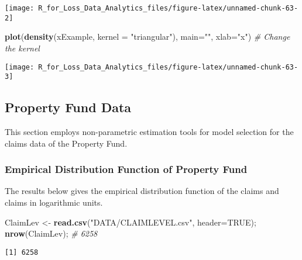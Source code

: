 \documentclass[]{book}
\newenvironment{Shaded}{\begin{snugshade}}{\end{snugshade}}
\newcommand{\KeywordTok}[1]{\textcolor[rgb]{0.13,0.29,0.53}{\textbf{#1}}}
\newcommand{\DataTypeTok}[1]{\textcolor[rgb]{0.13,0.29,0.53}{#1}}
\newcommand{\StringTok}[1]{\textcolor[rgb]{0.31,0.60,0.02}{#1}}
\newcommand{\CommentTok}[1]{\textcolor[rgb]{0.56,0.35,0.01}{\textit{#1}}}
\newcommand{\OtherTok}[1]{\textcolor[rgb]{0.56,0.35,0.01}{#1}}
\newcommand{\NormalTok}[1]{#1}
\theoremstyle{definition}
\theoremstyle{definition}
\theoremstyle{definition}
\theoremstyle{remark}
\begin{document}
\begin{center}\texttt{[image: R\_for\_Loss\_Data\_Analytics\_files/figure-latex/unnamed-chunk-63-2]} \end{center}

\begin{Shaded}
\begin{Highlighting}[]
\KeywordTok{plot}\NormalTok{(}\KeywordTok{density}\NormalTok{(xExample, }\DataTypeTok{kernel =} \StringTok{"triangular"}\NormalTok{), }\DataTypeTok{main=}\StringTok{""}\NormalTok{, }\DataTypeTok{xlab=}\StringTok{"x"}\NormalTok{) }\CommentTok{# Change the kernel}
\end{Highlighting}
\end{Shaded}

\begin{center}\texttt{[image: R\_for\_Loss\_Data\_Analytics\_files/figure-latex/unnamed-chunk-63-3]} \end{center}

\subsection{Property Fund Data}\label{property-fund-data}

This section employs non-parametric estimation tools for model selection
for the claims data of the Property Fund.

\subsubsection{Empirical Distribution Function of Property
Fund}\label{empirical-distribution-function-of-property-fund}

The results below gives the empirical distribution function of the
claims and claims in logarithmic units.

\begin{Shaded}
\begin{Highlighting}[]
\NormalTok{ClaimLev <-}\StringTok{ }\KeywordTok{read.csv}\NormalTok{(}\StringTok{"DATA/CLAIMLEVEL.csv"}\NormalTok{, }\DataTypeTok{header=}\OtherTok{TRUE}\NormalTok{); }\KeywordTok{nrow}\NormalTok{(ClaimLev); }\CommentTok{# 6258}
\end{Highlighting}
\end{Shaded}

\begin{verbatim}
[1] 6258
\end{verbatim}
\end{document}
